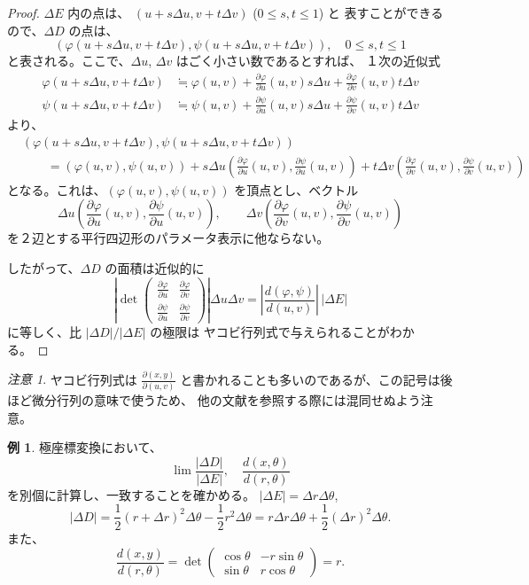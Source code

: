 \documentclass[a4paper]{jsarticle}
\theoremstyle{definition}
\newtheorem{Example}[Theorem]{例}
\theoremstyle{remark}
\newtheorem{Remark}{注意}
\newcommand{\del}{\partial}
\begin{document}
\begin{proof}
$\Delta E$ 内の点は、
$(u+s\Delta u, v+t\Delta v)$ ($0 \leq s, t \leq 1$) と
表すことができるので、$\Delta D$ の点は、
\[
(\varphi(u+s\Delta u,v+t\Delta v),\psi(u+s\Delta u,v+t\Delta v)),\quad
0 \leq s,t \leq 1
\]
と表される。ここで、$\Delta u$, $\Delta v$ はごく小さい数であるとすれば、
１次の近似式
\begin{align*}
\varphi(u+s\Delta u,v+t\Delta v) &\fallingdotseq 
\varphi(u,v) + \frac{\del\varphi}{\del u}(u,v) s\Delta u 
+ \frac{\del\varphi}{\del v}(u,v) t\Delta v\\
\psi(u+s\Delta u,v+t\Delta v) &\fallingdotseq 
\psi(u,v) + \frac{\del\psi}{\del u}(u,v) s\Delta u 
+ \frac{\del\psi}{\del v}(u,v) t\Delta v
\end{align*}
より、
\[
\begin{split}
&(\varphi(u+s\Delta u,v+t\Delta v),\psi(u+s\Delta u,v+t\Delta v))\\
&\qquad=
(\varphi(u,v),\psi(u,v)) + 
s\Delta u(\frac{\del\varphi}{\del u}(u,v), \frac{\del\psi}{\del u}(u,v))
+ t\Delta v(\frac{\del\varphi}{\del v}(u,v), \frac{\del\psi}{\del v}(u,v))
\end{split}
\]
となる。これは、$(\varphi(u,v),\psi(u,v))$ を頂点とし、ベクトル
\[
\Delta u(\frac{\del\varphi}{\del u}(u,v), \frac{\del\psi}{\del u}(u,v)),
\qquad
\Delta v(\frac{\del\varphi}{\del v}(u,v), \frac{\del\psi}{\del v}(u,v))
\]
を２辺とする平行四辺形のパラメータ表示に他ならない。

したがって、$\Delta D$ の面積は近似的に
\[
\left|
\det\begin{pmatrix}
\frac{\del\varphi}{\del u} & \frac{\del\varphi}{\del v}\\
\frac{\del\psi}{\del u} & \frac{\del\psi}{\del v}
\end{pmatrix}
\right| \Delta u \Delta v 
= \left| \frac{d(\varphi,\psi)}{d(u,v)} \right|\,  |\Delta E|
\]
に等しく、比 $|\Delta D|/|\Delta E|$ の極限は ヤコビ行列式で与えられることがわかる。
\end{proof} 

\begin{Remark}{\small
    ヤコビ行列式は $\frac{\partial(x,y)}{\partial(u,v)}$ と書かれることも多いのであるが、この記号は後ほど微分行列の意味で使うため、
    他の文献を参照する際には混同せぬよう注意。
 }
  \end{Remark}
  
\begin{Example}
極座標変換において、
\[
\lim \frac{|\Delta D|}{|\Delta E|}, 
\quad 
\frac{d(x,\theta)}{d(r,\theta)}
\]
を別個に計算し、一致することを確かめる。
$|\Delta E| = \Delta r \Delta \theta$, 
\[
|\Delta D| = \frac{1}{2} (r + \Delta r)^2 \Delta\theta 
- \frac{1}{2} r^2\Delta\theta 
= r \Delta r \Delta\theta + \frac{1}{2} (\Delta r)^2 \Delta\theta. 
\]
また、
\[
\frac{d(x,y)}{d(r,\theta)} = 
\det \begin{pmatrix}
\cos\theta & -r\sin\theta\\
\sin\theta & r\cos\theta
\end{pmatrix}
= r.
\]
\end{Example}
\end{document}
